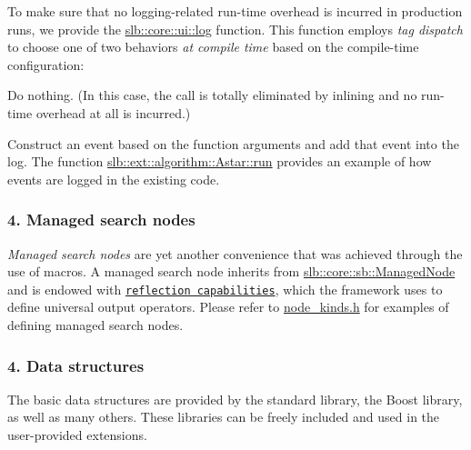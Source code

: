 To make sure that no logging-\/related run-\/time overhead is incurred in production runs, we provide the \hyperlink{namespaceslb_1_1core_1_1ui_acdeb0db1847459cac6f4eeb22bbb5998}{slb\+::core\+::ui\+::log} function. This function employs {\itshape tag dispatch} to choose one of two behaviors {\itshape at compile time} based on the compile-\/time configuration\+:
\begin{DoxyItemize}
\item Do nothing. (In this case, the call is totally eliminated by inlining and no run-\/time overhead at all is incurred.)
\item Construct an event based on the function arguments and add that event into the log. The function \hyperlink{structslb_1_1ext_1_1algorithm_1_1Astar_af46d0fe401539d7ae297dc4d059f5b5f}{slb\+::ext\+::algorithm\+::\+Astar\+::run} provides an example of how events are logged in the existing code.
\end{DoxyItemize}\hypertarget{index_s-nodes}{}\subsubsection{4. Managed search nodes}\label{index_s-nodes}
{\itshape Managed search nodes} are yet another convenience that was achieved through the use of macros. A managed search node inherits from \hyperlink{structslb_1_1core_1_1sb_1_1ManagedNode}{slb\+::core\+::sb\+::\+Managed\+Node} and is endowed with \href{http://stackoverflow.com/a/11744832/2725810}{\tt reflection capabilities}, which the framework uses to define universal output operators. Please refer to \hyperlink{node__kinds_8h}{node\+\_\+kinds.\+h} for examples of defining managed search nodes.\hypertarget{index_s-structures}{}\subsubsection{4. Data structures}\label{index_s-structures}
The basic data structures are provided by the standard library, the Boost library, as well as many others. These libraries can be freely included and used in the user-\/provided extensions.

